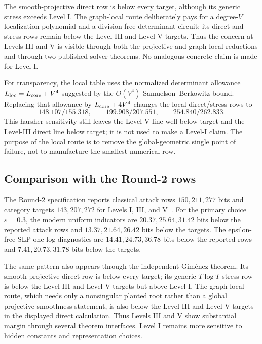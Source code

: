 \documentclass[11pt,a4paper]{article}
\theoremstyle{definition}
\theoremstyle{remark}
\begin{document}
The smooth-projective direct row is below every target, although its generic stress exceeds Level I.  The graph-local route deliberately pays for a degree-$V$ localization polynomial and a division-free determinant circuit; its direct and stress rows remain below the Level-III and Level-V targets.  Thus the concern at Levels III and V is visible through both the projective and graph-local reductions and through two published solver theorems.  No analogous concrete claim is made for Level I.

For transparency, the local table uses the normalized determinant allowance $L_{\rm loc}=L_{\rm core}+V^4$ suggested by the $O(V^4)$ Samuelson--Berkowitz bound.  Replacing that allowance by $L_{\rm core}+4V^4$ changes the local direct/stress rows to
\[
 148.107/155.318,\qquad199.908/207.551,\qquad254.840/262.833.
\]
This harsher sensitivity still leaves the Level-V line well below target and the Level-III direct line below target; it is not used to make a Level-I claim.  The purpose of the local route is to remove the global-geometric single point of failure, not to manufacture the smallest numerical row.

\subsection{Comparison with the Round-2 rows}

The Round-2 specification reports classical attack rows $150,211,277$ bits and category targets $143,207,272$ for Levels I, III, and V~\cite[Table~14]{QRUOVSpec}.  For the primary choice $\varepsilon=0.3$, the modern uniform indicators are $20.37,25.64,31.42$ bits below the reported attack rows and $13.37,21.64,26.42$ bits below the targets.  The epsilon-free SLP one-log diagnostics are $14.41,24.73,36.78$ bits below the reported rows and $7.41,20.73,31.78$ bits below the targets.

The same pattern also appears through the independent Gim\'enez theorem.  Its smooth-projective direct row is below every target; its generic $T\log T$ stress row is below the Level-III and Level-V targets but above Level I.  The graph-local route, which needs only a nonsingular planted root rather than a global projective smoothness statement, is also below the Level-III and Level-V targets in the displayed direct calculation.  Thus Levels III and V show substantial margin through several theorem interfaces.  Level I remains more sensitive to hidden constants and representation choices.
\end{document}
